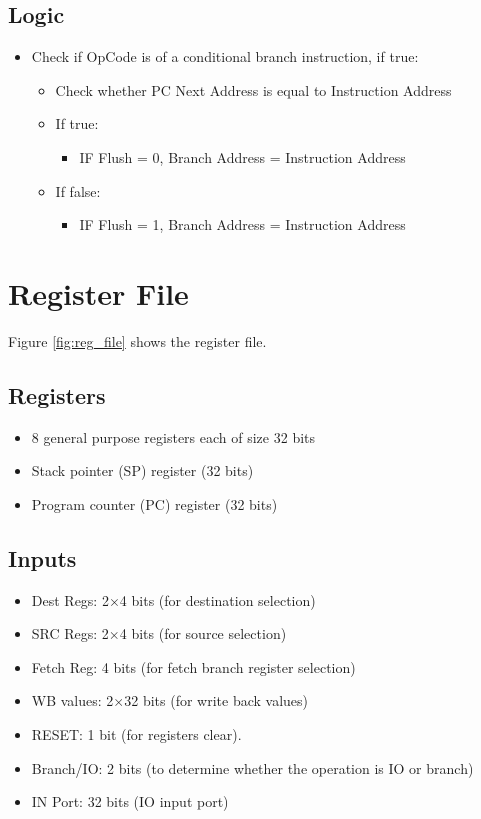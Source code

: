 \subsection{Logic}
\begin{itemize}
    \item Check if OpCode is of a conditional branch instruction, if true:
    \begin{itemize}
        \item Check whether PC Next Address is equal to Instruction Address
        \item If true:
        \begin{itemize}
            \item IF Flush = 0, Branch Address = Instruction Address
        \end{itemize}
        \item If false:
        \begin{itemize}
            \item IF Flush = 1, Branch Address = Instruction Address
        \end{itemize}
    \end{itemize}
\end{itemize}

\section{Register File}
Figure \ref{fig:reg_file} shows the register file.

\subsection{Registers}
\begin{itemize}
    \item 8 general purpose registers each of size 32 bits
    \item Stack pointer (SP) register (32 bits)
    \item Program counter (PC) register (32 bits)
\end{itemize}

\subsection{Inputs}
\begin{itemize}
    \item Dest Regs: 2$\times$4 bits (for destination selection)
    \item SRC Regs: 2$\times$4 bits (for source selection)
    \item Fetch Reg: 4 bits (for fetch branch register selection)
    \item WB values: 2$\times$32 bits (for write back values)
    \item RESET: 1 bit (for registers clear).
    \item Branch/IO: 2 bits (to determine whether the operation is IO or branch)
    \item IN Port: 32 bits (IO input port)
\end{itemize}

